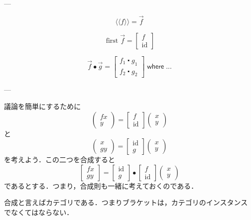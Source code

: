 \documentclass[a5paper,twoside,fleqn,draft]{jsbook}
\newcommand{\Langle}{\langle\!\langle}
\newcommand{\Rangle}{\rangle\!\rangle}
\newcommand{\mKeyword}[1]{\mathsf{#1}}
\newcommand{\mWhereKeyword}{\mKeyword{where}}
\DeclareMathOperator{\mWhere}{\mWhereKeyword}
\newcommand{\mSpecialFunc}[1]{#1}
\DeclareMathOperator{\mFirst}{\mSpecialFunc{first}}
\DeclareMathOperator{\mId}{\mSpecialFunc{id}}
\DeclareMathOperator{\mComp}{\centerdot}
\DeclareMathOperator{\mCompCat}{\bullet}
\newcommand{\mArrowWith}[1]{\Langle#1\Rangle}
\newcommand{\mPairWith}[2]{\begin{pmatrix}#1\\#2\end{pmatrix}}
\newcommand{\mArrow}[1]{\Vec{#1}}
\begin{document}
---

\begin{equation}
  \mArrowWith{f}=\mArrow{f}
\end{equation}

\begin{equation}
  \mFirst\mArrow{f}=\begin{bmatrix}f\\\mId\end{bmatrix}
\end{equation}

\begin{equation}
  \mArrow{f}\mCompCat\mArrow{g}
  =
  \begin{bmatrix}
    f_1\mComp g_1\\
    f_2\mComp g_2
  \end{bmatrix}
  \mWhere...
\end{equation}

---

議論を簡単にするために
\begin{equation}
  \mPairWith{fx}{y}
  =\begin{bmatrix}
  f\\
  \mId
  \end{bmatrix}
  \mPairWith{x}{y}
\end{equation}
と
\begin{equation}
  \mPairWith{x}{gy}
  =\begin{bmatrix}
  \mId\\
  g
  \end{bmatrix}
  \mPairWith{x}{y}
\end{equation}
を考えよう．この二つを合成すると
\begin{equation}
  \begin{bmatrix}
    fx\\
    gy
  \end{bmatrix}
  =
  \begin{bmatrix}
    \mId\\
    g
  \end{bmatrix}
  \mCompCat
  \begin{bmatrix}
    f\\
    \mId
  \end{bmatrix}
  \mPairWith{x}{y}
\end{equation}
であるとする．つまり，合成則も一緒に考えておくのである．

合成と言えばカテゴリである．つまりブラケットは，カテゴリのインスタンス
でなくてはならない．
\end{document}
